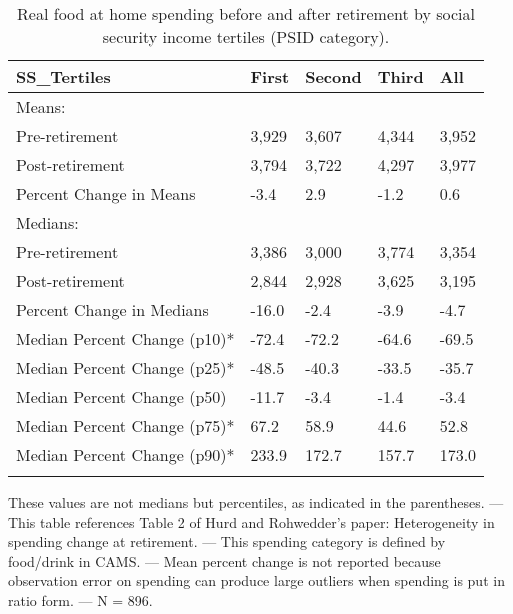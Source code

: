 \begin{table}[tbp] \centering
{}

\caption{Real food at home spending before and after retirement by social security income tertiles (PSID category).}
\begin{tabularx}{\textwidth}{lCCCC}

\toprule
{SS\_Tertiles}&{First}&{Second}&{Third}&{All} \tabularnewline
\midrule\addlinespace[1.5ex]
Means:&&&& \tabularnewline
\midrule Pre-retirement&3,929&3,607&4,344&3,952 \tabularnewline
Post-retirement&3,794&3,722&4,297&3,977 \tabularnewline
Percent Change in Means&-3.4&2.9&-1.2&0.6 \tabularnewline
\midrule Medians:&&&& \tabularnewline
\midrule Pre-retirement&3,386&3,000&3,774&3,354 \tabularnewline
Post-retirement&2,844&2,928&3,625&3,195 \tabularnewline
Percent Change in Medians&-16.0&-2.4&-3.9&-4.7 \tabularnewline
Median Percent Change (p10)*&-72.4&-72.2&-64.6&-69.5 \tabularnewline
Median Percent Change (p25)*&-48.5&-40.3&-33.5&-35.7 \tabularnewline
Median Percent Change (p50)&-11.7&-3.4&-1.4&-3.4 \tabularnewline
Median Percent Change (p75)*&67.2&58.9&44.6&52.8 \tabularnewline
Median Percent Change (p90)*&233.9&172.7&157.7&173.0 \tabularnewline
\bottomrule \addlinespace[1.5ex]

\end{tabularx}
\begin{flushleft}
\footnotesize *These values are not medians but percentiles, as indicated in the parentheses. \linebreak --- \linebreak This table references Table 2 of Hurd and Rohwedder's paper: Heterogeneity in spending change at retirement. \linebreak --- \linebreak This spending category is defined by food/drink in CAMS. \linebreak --- \linebreak Mean percent change is not reported because observation error on spending can produce large outliers when spending is put in ratio form. \linebreak --- \linebreak N = 896.
\end{flushleft}
\end{table}
